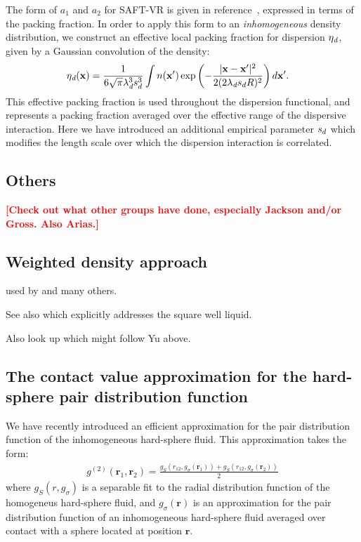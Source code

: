 \documentclass[letterpaper,twocolumn,amsmath,amssymb,pre,aps,10pt]{revtex4-1}
\newcommand\xx{\mathbf{x}}
\newcommand\rr{\mathbf{r}}
\newcommand\fixme[1]{\textcolor{red}{\textbf{[#1]}}}
\begin{document}
The form of $a_1$ and $a_2$ for SAFT-VR is given in
reference~\cite{gil-villegas-1997-SAFT-VR}, expressed in terms
of the packing fraction.  In order to apply this form to an
\emph{inhomogeneous} density distribution, we construct an effective local
packing fraction for dispersion $\eta_\textit{d}$, given by a Gaussian
convolution of the density:
\begin{align}
  \etadisp(\xx) &= \frac{1}{6\sqrt{\pi} \lambdadisp^3\lscale^3}
  \int n(\xx')\exp\left({-\frac{|\xx-\xx'|^2}{2(2 \lambdadisp
      \lscale R)^2}}\right)d\xx'.
\end{align}
This effective packing fraction is used throughout the dispersion
functional, and represents a packing fraction averaged over the
effective range of the dispersive interaction.  Here we have
introduced an additional empirical parameter $s_d$ which modifies
the length scale over which the dispersion interaction is correlated.

\subsection{Others}

\fixme{Check out what other groups have done, especially Jackson
  and/or Gross.  Also Arias.}

\subsection{Weighted density approach}

\cite{peng2008meanfield} used by
\cite{sundararaman2013efficient} and many others.

See also \cite{yu2009novel} which explicitly addresses the square well
liquid.

Also look up \cite{shen2013hybrid} which might follow Yu above.

\subsection{The contact value approximation for the hard-sphere pair distribution function}

We have recently introduced an efficient approximation for the pair
distribution function of the inhomogeneous hard-sphere fluid.  This
approximation takes the form:
\begin{align}
  g^{(2)}(\rr_1,\rr_2) = \frac{g_S(r_{12}, g_\sigma(\rr_1)) +
    g_S(r_{12}, g_\sigma(\rr_2))}{2} \label{eq:g2-our-mean}
\end{align}
where $g_S(r,g_\sigma)$ is a separable fit to the radial distribution
function of the homogeneus hard-sphere fluid, and $g_\sigma(\rr)$ is
an approximation for the pair distribution function of an
inhomogeneous hard-sphere fluid averaged over contact with a sphere
located at position $\rr$.
\end{document}

